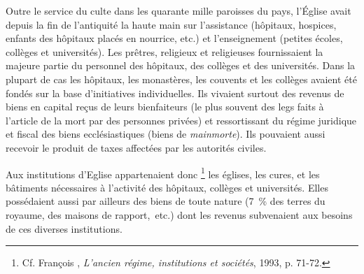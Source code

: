  Outre le service du culte dans les quarante mille paroisses du pays, l'Église avait  depuis la fin de l'antiquité la haute main sur l'assistance (hôpitaux, hospices, enfants des hôpitaux placés en nourrice, etc.) et l'enseignement (petites écoles, collèges et universités). Les prêtres, religieux et religieuses fournissaient la majeure partie du personnel des hôpitaux, des collèges et des universités. Dans la plupart de cas les hôpitaux, les monastères, les couvents et les collèges avaient été fondés sur la base d'initiatives individuelles. Ils vivaient surtout des revenus de biens en capital reçus de leurs bienfaiteurs (le plus souvent des legs faits à l'article de la mort par des personnes privées) et ressortissant du régime juridique et fiscal des biens ecclésiastiques (biens de \emph{mainmorte}). Ils pouvaient aussi recevoir le produit de taxes affectées par les autorités civiles. 
 
 Aux institutions d'Eglise appartenaient donc%
\footnote{Cf. François , \emph{L'ancien régime, institutions et sociétés}, 1993, p. 71-72.} 
les églises, les cures, et les bâtiments nécessaires à l'activité des hôpitaux, collèges et universités. Elles possédaient aussi par ailleurs des biens de toute nature (7~\% des terres du royaume, des maisons de rapport,~etc.) dont les revenus subvenaient aux besoins de ces diverses institutions. 

